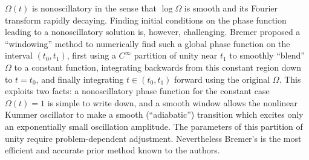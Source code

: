 \documentclass[10pt]{article}
\begin{document}
$\Omega(t)$ is
nonoscillatory in the sense that $\log \Omega$ is smooth and its Fourier transform rapidly decaying.
Finding initial conditions on the phase function leading to
a nonoscillatory solution is, however, challenging.
Bremer proposed a ``windowing'' method to numerically find such a global phase function on the interval $(t_0,t_1)$,
first using a $C^\infty$ partition of unity near $t_1$ to smoothly ``blend'' $\Omega$ to
a constant function, integrating backwards from this constant region
down to $t = t_0$, and finally integrating $t \in (t_0,t_1)$ forward using the original $\Omega$.
This exploits two facts: a nonoscillatory phase function for
the constant case $\Omega(t) = 1$ is simple to write down, and
a smooth window allows the nonlinear Kummer oscillator to make a smooth 
(``adiabatic'')
transition which excites only an exponentially small oscillation amplitude.
The parameters of this partition of unity require problem-dependent
adjustment.
Nevertheless Bremer's is the most efficient
and accurate prior method known to the authors.
\end{document}
